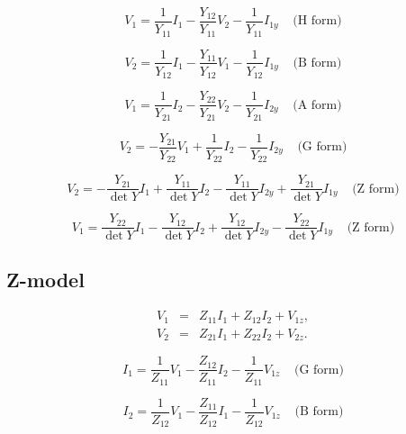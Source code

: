 \documentclass[a4paper, 12pt]{article}
\newcommand{\bigspace}{\;\;\;\;}
\begin{document}
\begin{equation}
  V_1 = \frac{1}{Y_{11}} I_1 - \frac{Y_{12}}{Y_{11}} V_2 - \frac{1}{Y_{11}} I_{1y} \bigspace \mbox{(H form)}
\end{equation}

\begin{equation}
  V_2 = \frac{1}{Y_{12}} I_1 - \frac{Y_{11}}{Y_{12}} V_1 - \frac{1}{Y_{12}} I_{1y} \bigspace \mbox{(B form)}
\end{equation}

\begin{equation}
  V_1 = \frac{1}{Y_{21}} I_2 - \frac{Y_{22}}{Y_{21}} V_2 - \frac{1}{Y_{21}} I_{2y} \bigspace \mbox{(A form)}
\end{equation}


\begin{equation}
  V_2 = -\frac{Y_{21}}{Y_{22}} V_1 + \frac{1}{Y_{22}} I_2 - \frac{1}{Y_{22}} I_{2y} \bigspace \mbox{(G form)}
\end{equation}


\begin{equation}
  V_2 = -\frac{Y_{21}}{\det{Y}} I_1 + \frac{Y_{11}}{\det{Y}} I_2 - \frac{Y_{11}}{\det{Y}} I_{2y} + \frac{Y_{21}}{\det{Y}} I_{1y} \bigspace \mbox{(Z form)}
\end{equation}


\begin{equation}
  V_1 = \frac{Y_{22}}{\det{Y}} I_1 - \frac{Y_{12}}{\det{Y}} I_2 + \frac{Y_{12}}{\det{Y}} I_{2y} - \frac{Y_{22}}{\det{Y}} I_{1y} \bigspace \mbox{(Z form)}
\end{equation}



\subsection{Z-model}

\begin{eqnarray}
\label{eqn:ZV1}
  V_1 & = & Z_{11} I_1 + Z_{12} I_2 + V_{1z}, \\
  V_2 & = & Z_{21} I_1 + Z_{22} I_2 + V_{2z}.
\label{eqn:ZV2}
\end{eqnarray}



\begin{equation}
  I_1 = \frac{1}{Z_{11}} V_1 - \frac{Z_{12}}{Z_{11}} I_2 - \frac{1}{Z_{11}} V_{1z} \bigspace \mbox{(G form)}
\end{equation}

\begin{equation}
  I_2 = \frac{1}{Z_{12}} V_1 - \frac{Z_{11}}{Z_{12}} I_1 - \frac{1}{Z_{12}} V_{1z} \bigspace \mbox{(B form)}
\end{equation}
\end{document}

